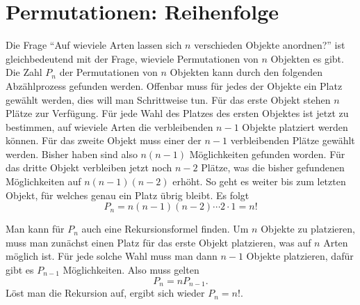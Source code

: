 \section{Permutationen: Reihenfolge} \label{kombinatorik-permutation}
Die Frage ``Auf wieviele Arten lassen sich $n$ verschieden Objekte anordnen?''
ist gleichbedeutend mit der Frage, wieviele Permutationen von $n$
Objekten es gibt.
Die Zahl  $P_n$ der Permutationen von $n$ Objekten
kann durch den folgenden Abzählprozess gefunden werden.
Offenbar muss für jedes der Objekte ein Platz gewählt werden, dies will
man Schrittweise tun.
Für das erste Objekt stehen $n$ Plätze
zur Verfügung.
Für jede Wahl des Platzes des ersten Objektes 
ist jetzt zu bestimmen, auf wieviele Arten die verbleibenden
$n-1$ Objekte platziert werden können.
Für das zweite
Objekt muss einer der $n-1$ verbleibenden Plätze gewählt werden.
Bisher haben sind also $n(n-1)$ Möglichkeiten gefunden worden.
Für das dritte Objekt verbleiben jetzt noch $n-2$ Plätze,
was die bisher gefundenen Möglichkeiten auf $n(n-1)(n-2)$
erhöht.
So geht es weiter bis zum letzten Objekt, für welches
genau ein Platz übrig bleibt.
Es folgt
\[
P_n=n(n-1)(n-2)\dotsm 2\cdot 1=n!
\]

Man kann für $P_n$ auch eine Rekursionsformel finden.
Um $n$ Objekte
zu platzieren, muss man zunächst einen Platz für das erste Objekt
platzieren, was auf $n$ Arten möglich ist.
Für jede solche Wahl
muss man dann $n-1$ Objekte platzieren, dafür gibt es $P_{n-1}$
Möglichkeiten.
Also muss gelten
\[
P_n=nP_{n-1}.
\]
Löst man die Rekursion auf, ergibt sich wieder $P_n=n!$.


